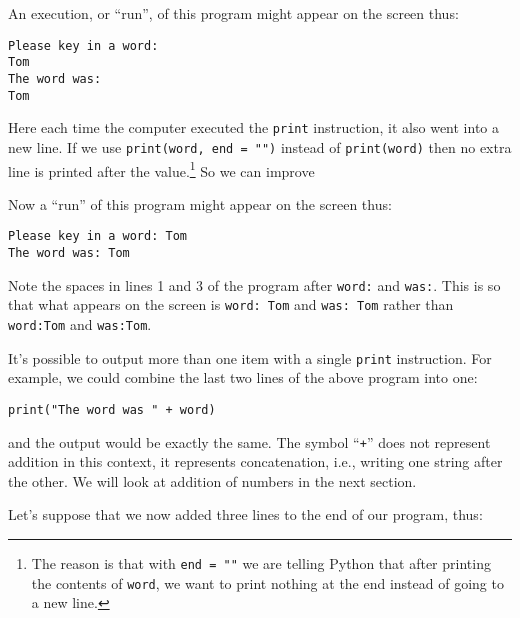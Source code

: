 
An execution, or ``run'', of this program might appear on the screen thus:
\begin{Verbatim}
Please key in a word:
Tom
The word was:
Tom
\end{Verbatim}

Here each time the computer executed the \verb!print! instruction,
it also went into a new line.
If we use \verb!print(word, end = "")! instead of \verb!print(word)!
then no extra line is printed after the value.\footnote{The reason is that
 with \Verb!end = ""! we are telling Python that after printing the contents
 of \Verb!word!, we want to print nothing at the end instead of going to a
 new line.}
So we can improve 


Now a ``run'' of this program might appear on the screen thus:
\begin{Verbatim}
Please key in a word: Tom
The word was: Tom
\end{Verbatim}

Note the spaces in lines 1 and 3 of the program after \verb!word:! and \verb!was:!.
This is so that what appears on the screen is \verb!word: Tom! and
\verb!was: Tom! rather than \verb!word:Tom! and \verb!was:Tom!.

It's possible to output more than one item with a single \verb!print! instruction.
For example, we could combine the last two lines of the above program into one:

\begin{Verbatim}
print("The word was " + word)
\end{Verbatim}

and the output would be exactly the same. The symbol ``\texttt{+}'' does not
represent addition in this context, it represents concatenation, i.e.,
writing one string after the other. We will look at addition of numbers in the next section.


Let's suppose that we now added three lines to the end of our program, thus:



